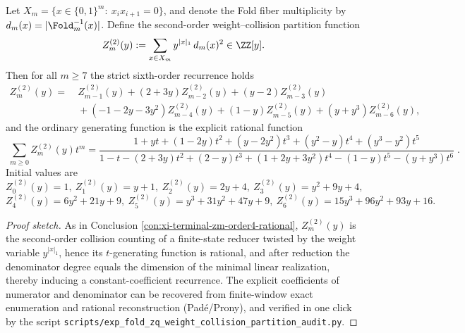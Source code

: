 
\begin{conclusion}[Weight--collision partition function for \texorpdfstring{$(q=2)$}{(q=2)}: sixth-order recurrence and rational generating function]\label{con:xi-terminal-zm2-order6-rational}
Let
\(
X_m=\{x\in\{0,1\}^m:\ x_ix_{i+1}=0\}
\),
and denote the Fold fiber multiplicity by \(d_m(x)=|\Fold_m^{-1}(x)|\).
Define the second-order weight--collision partition function
\[
Z_m^{(2)}(y):=\sum_{x\in X_m} y^{|x|_1}\,d_m(x)^2\in\ZZ[y].
\]
Then for all \(m\ge 7\) the strict sixth-order recurrence holds
\[
\begin{aligned}
Z_m^{(2)}(y)=&\ Z_{m-1}^{(2)}(y)+(2+3y)Z_{m-2}^{(2)}(y)+(y-2)Z_{m-3}^{(2)}(y)\\
&\ +(-1-2y-3y^2)Z_{m-4}^{(2)}(y)+(1-y)Z_{m-5}^{(2)}(y)+(y+y^3)Z_{m-6}^{(2)}(y),
\end{aligned}
\]
and the ordinary generating function is the explicit rational function
\[
\boxed{\;
\sum_{m\ge 0} Z_m^{(2)}(y)t^m
=\frac{1+yt+(1-2y)t^2+(y-2y^2)t^3+(y^2-y)t^4+(y^3-y^2)t^5}{1-t-(2+3y)t^2+(2-y)t^3+(1+2y+3y^2)t^4-(1-y)t^5-(y+y^3)t^6}\; }.
\]
Initial values are
\[
Z_0^{(2)}(y)=1,\
Z_1^{(2)}(y)=y+1,\
Z_2^{(2)}(y)=2y+4,\
Z_3^{(2)}(y)=y^2+9y+4,
\]
\[
Z_4^{(2)}(y)=6y^2+21y+9,\
Z_5^{(2)}(y)=y^3+31y^2+47y+9,\
Z_6^{(2)}(y)=15y^3+96y^2+93y+16.
\]
\end{conclusion}
\begin{proof}[Proof sketch]
As in Conclusion \ref{con:xi-terminal-zm-order4-rational},
\(Z_m^{(2)}(y)\) is the second-order collision counting of a finite-state reducer twisted by the weight variable \(y^{|x|_1}\),
hence its \(t\)-generating function is rational, and after reduction the denominator degree equals the dimension of the minimal linear realization, thereby inducing a constant-coefficient recurrence.
The explicit coefficients of numerator and denominator can be recovered from finite-window exact enumeration and rational reconstruction (Padé/Prony), and verified in one click by the script
\texttt{scripts/exp\_fold\_zq\_weight\_collision\_partition\_audit.py}.
\end{proof}

